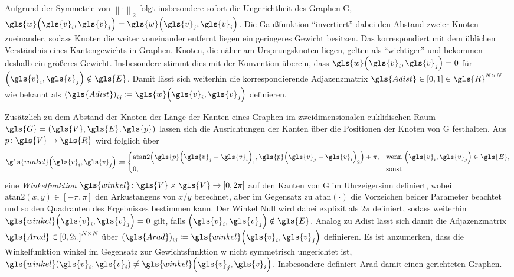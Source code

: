 Aufgrund der Symmetrie von ${\left\|\cdot\right\|}_2$ folgt insbesondere sofort die Ungerichtheit des Graphen \gls{G}, \dhe{} $\gls{w}\left(\gls{v}_i, \gls{v}_j\right) = \gls{w}\left(\gls{v}_j, \gls{v}_i\right)$.
Die Gaußfunktion \enquote{invertiert} dabei den Abstand zweier Knoten zueinander, sodass Knoten die weiter voneinander entfernt liegen ein geringeres Gewicht besitzen.
Das korrespondiert mit dem üblichen Verständnis eines Kantengewichts in Graphen.
Knoten, die näher am Ursprungsknoten liegen, gelten als \enquote{wichtiger} und bekommen deshalb ein größeres Gewicht.
Insbesondere stimmt dies mit der Konvention überein, dass $\gls{w}\left(\gls{v}_i, \gls{v}_j\right) = 0$ für $\left(\gls{v}_i, \gls{v}_j\right) \notin \gls{E}$.
Damit lässt sich weiterhin die korrespondierende Adjazenzmatrix $\gls{Adist} \in \left[0, 1\right] \in \gls{R}^{N \times N}$ wie bekannt als ${\left(\gls{Adist}\right)}_{ij} \coloneqq \gls{w}\left(\gls{v}_i, \gls{v}_j\right)$ definieren.

Zusätzlich zu dem Abstand der Knoten \bzw{} der Länge der Kanten eines Graphen im zweidimensionalen euklidischen Raum $\gls{G} = \left(\gls{V}, \gls{E}, \gls{p}\right)$ lassen sich die Ausrichtungen der Kanten über die Positionen der Knoten von \gls{G} festhalten.
Aus $p \colon \gls{V} \to \gls{R}$ wird folglich über
\begin{equation*}
  \gls{winkel}\left(\gls{v}_i, \gls{v}_j\right) \coloneqq \begin{cases}
    \mathrm{atan2}\left({\gls{p}\left(\gls{v}_j - \gls{v}_i\right)}_1, {\gls{p}\left(\gls{v}_j - \gls{v}_i\right)}_2\right) + \pi, & \text{wenn }\left(\gls{v}_i, \gls{v}_j\right) \in \gls{E},\\
    0, & \text{sonst}
  \end{cases}
\end{equation*}
eine \emph{Winkelfunktion} $\gls{winkel} \colon \gls{V} \times \gls{V} \to \left[0, 2\pi\right]$ auf den Kanten von \gls{G} im Uhrzeigersinn definiert, wobei $\mathrm{atan2}\left(x, y\right) \in \left[-\pi, \pi\right]$ den Arkustangens von $x/y$ berechnet, aber im Gegensatz zu $\mathrm{atan}\left(\cdot\right)$ die Vorzeichen beider Parameter beachtet und so den Quadranten des Ergebnisses bestimmen kann.
Der Winkel Null wird dabei explizit als $2\pi$ definiert, sodass weiterhin $\gls{winkel}\left(\gls{v}_i, \gls{v}_j\right) = 0$ gilt, falls $\left(\gls{v}_i, \gls{v}_j\right) \notin \gls{E}$.
Analog zu \gls{Adist} lässt sich damit die Adjazenzmatrix $\gls{Arad} \in {\left[0, 2\pi\right]}^{N \times N}$ über ${\left(\gls{Arad}\right)}_{ij} \coloneqq \gls{winkel}\left(\gls{v}_i, \gls{v}_j\right)$ definieren.
Es ist anzumerken, dass die Winkelfunktion \gls{winkel} im Gegensatz zur Gewichtsfunktion \gls{w} nicht symmetrisch \bzw{} ungerichtet ist, \dhe{} $\gls{winkel}\left(\gls{v}_i, \gls{v}_i\right) \neq \gls{winkel}\left(\gls{v}_j, \gls{v}_i\right)$.
Insbesondere definiert \gls{Arad} damit einen gerichteten Graphen.

